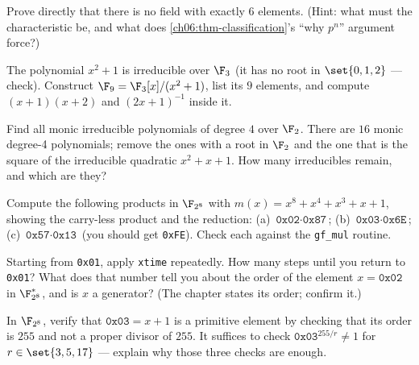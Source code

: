 \begin{exercise}
\label{ch06:ex-no6}
Prove directly that there is no field with exactly $6$ elements. (Hint: what
must the characteristic be, and what does
\autoref{ch06:thm-classification}'s ``why $p^n$'' argument force?)
\end{exercise}

\begin{exercise}[Build $\F_9$]
\label{ch06:ex-f9}
The polynomial $x^2+1$ is irreducible over $\F_3$ (it has no root in
$\set{0,1,2}$ --- check). Construct $\F_9 = \F_3[x]/(x^2+1)$, list its $9$
elements, and compute $(x+1)(x+2)$ and $(2x+1)^{-1}$ inside it.
\end{exercise}

\begin{exercise}
\label{ch06:ex-irred}
Find all monic irreducible polynomials of degree $4$ over $\F_2$. There are
$16$ monic degree-4 polynomials; remove the ones with a root in $\F_2$ and
the one that is the square of the irreducible quadratic $x^2+x+1$. How many
irreducibles remain, and which are they?
\end{exercise}

\begin{exercise}
\label{ch06:ex-aesmul}
Compute the following products in $\F_{2^8}$ with $m(x)=x^8+x^4+x^3+x+1$,
showing the carry-less product and the reduction:
(a) $\texttt{0x02}\cdot\texttt{0x87}$;\quad
(b) $\texttt{0x03}\cdot\texttt{0x6E}$;\quad
(c) $\texttt{0x57}\cdot\texttt{0x13}$ (you should get \texttt{0xFE}).
Check each against the \texttt{gf\_mul} routine.
\end{exercise}

\begin{exercise}
\label{ch06:ex-xtimechain}
Starting from \texttt{0x01}, apply \texttt{xtime} repeatedly. How many steps
until you return to \texttt{0x01}? What does that number tell you about the
order of the element $x = \texttt{0x02}$ in $\F_{2^8}^{*}$, and is $x$ a
generator? (The chapter states its order; confirm it.)
\end{exercise}

\begin{exercise}
\label{ch06:ex-gensearch}
In $\F_{2^8}$, verify that $\texttt{0x03} = x+1$ is a primitive element by
checking that its order is $255$ and not a proper divisor of $255$. It
suffices to check $\texttt{0x03}^{255/r}\neq 1$ for $r\in\set{3,5,17}$ ---
explain why those three checks are enough.
\end{exercise}

